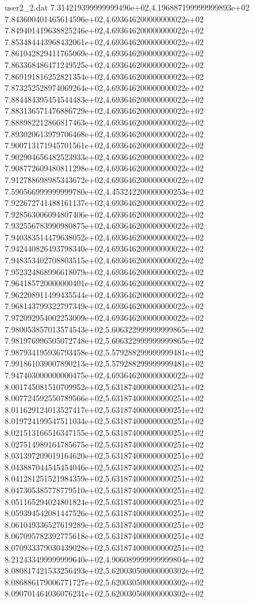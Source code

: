 \begin{filecontents}{user2_2.dat}
7.314219399999999496e+02,4.196887199999999893e+02
7.843600401465614596e+02,4.693646200000000022e+02
7.849401419638825246e+02,4.693646200000000022e+02
7.853484443968432061e+02,4.693646200000000022e+02
7.861042829411765069e+02,4.693646200000000022e+02
7.863368486471249525e+02,4.693646200000000022e+02
7.869191816252821354e+02,4.693646200000000022e+02
7.873252528974069264e+02,4.693646200000000022e+02
7.884484395454544483e+02,4.693646200000000022e+02
7.883136571476886729e+02,4.693646200000000022e+02
7.888982212866817463e+02,4.693646200000000022e+02
7.893020613979706468e+02,4.693646200000000022e+02
7.900713171945701561e+02,4.693646200000000022e+02
7.902904656482523933e+02,4.693646200000000022e+02
7.908772609480811298e+02,4.693646200000000022e+02
7.912788698985343672e+02,4.693646200000000022e+02
7.590566999999999780e+02,4.453242200000000253e+02
7.922672741488161137e+02,4.693646200000000022e+02
7.928563006094807406e+02,4.693646200000000022e+02
7.932556783990980875e+02,4.693646200000000022e+02
7.940383514479638052e+02,4.693646200000000022e+02
7.942440826493798340e+02,4.693646200000000022e+02
7.948353402708803515e+02,4.693646200000000022e+02
7.952324868996618079e+02,4.693646200000000022e+02
7.964185720000000401e+02,4.693646200000000022e+02
7.962208911499435544e+02,4.693646200000000022e+02
7.968143799322797349e+02,4.693646200000000022e+02
7.972092954002253009e+02,4.693646200000000022e+02
7.980053857013574543e+02,5.606322999999999865e+02
7.981976996505072748e+02,5.606322999999999865e+02
7.987934195936793458e+02,5.579288299999999481e+02
7.991861039007890213e+02,5.579288299999999481e+02
7.947403000000000475e+02,4.693646200000000022e+02
8.001745081510709952e+02,5.631874000000000251e+02
8.007724592550789566e+02,5.631874000000000251e+02
8.011629124013527417e+02,5.631874000000000251e+02
8.019724199547511034e+02,5.631874000000000251e+02
8.021513166516347155e+02,5.631874000000000251e+02
8.027514989164785675e+02,5.631874000000000251e+02
8.031397209019164620e+02,5.631874000000000251e+02
8.043887044545454046e+02,5.631874000000000251e+02
8.041281251521984359e+02,5.631874000000000251e+02
8.047305385778779510e+02,5.631874000000000251e+02
8.051165294024801824e+02,5.631874000000000251e+02
8.059394542081447526e+02,5.631874000000000251e+02
8.061049336527619289e+02,5.631874000000000251e+02
8.067095782392775618e+02,5.631874000000000251e+02
8.070933379030439028e+02,5.631874000000000251e+02
8.212433499999999640e+02,4.906089999999999804e+02
8.080817421533256493e+02,5.620030500000000302e+02
8.086886179006771727e+02,5.620030500000000302e+02
8.090701464036076231e+02,5.620030500000000302e+02

\end{filecontents}
